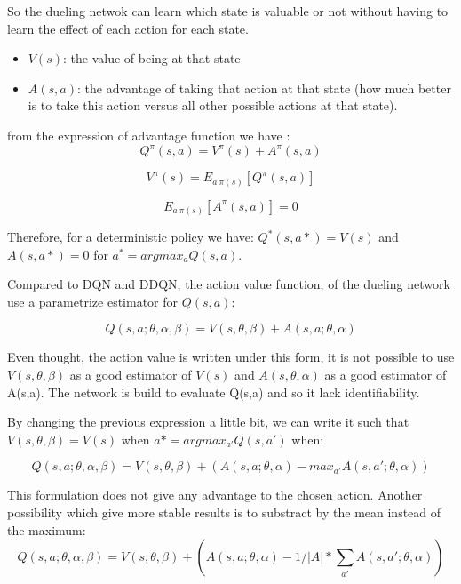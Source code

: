 \documentclass[12pt]{article}
\begin{document}
So the dueling netwok can learn which state is valuable or not without having to learn the effect of each action for each state.
\begin{itemize}
\item $V(s)$: the value of being at that state
\item $A(s,a)$: the advantage of taking that action at that state (how much better is to take this action versus all other possible actions at that state).
\end{itemize}

from the expression of advantage function we have :
\begin{equation}
	Q^{\pi}(s,a)=V^\pi (s) +A^\pi (s,a)
\end{equation}

\begin{equation}
	V^\pi (s)=E_{a ~ \pi(s)}[Q^\pi (s,a)]
\end{equation}

\begin{equation}
	E_{a ~ \pi(s)}[A^\pi (s,a)]=0
\end{equation}

Therefore, for a deterministic policy we have: $Q^*(s,a*)=V(s)$ and $A(s,a*)=0$ for $a^{*}=argmax_a Q(s,a)$.

Compared to DQN and DDQN, the action value function, of the dueling network use a parametrize estimator for $Q(s,a)$:

\begin{equation}
	Q(s,a;\theta,\alpha,\beta)=V(s,\theta,\beta) +A(s,a;\theta,\alpha)
\end{equation}

Even thought, the action value is written under this form, it is not possible to use $V(s,\theta,\beta)$ as a good estimator of $V(s)$ and $A(s,\theta,\alpha)$ as a good estimator of A(s,a). 
The network is build to evaluate Q(s,a) and so it lack identifiability.

By changing the previous expression a little bit, we can write it such that $V(s,\theta,\beta)=V(s)$ when $a*=argmax_{a'}Q(s,a')$ when:

\begin{equation}
	Q(s,a;\theta,\alpha,\beta)=V(s,\theta,\beta) +(A(s,a;\theta,\alpha)-max_{a'}A(s,a';\theta,\alpha))
\end{equation}

This formulation does not give any advantage to the chosen action. 
Another possibility which give more stable results is to substract by the mean instead of the maximum:
\begin{equation}
	Q(s,a;\theta,\alpha,\beta)=V(s,\theta,\beta) +(A(s,a;\theta,\alpha)-1/{|A|}*\sum_{a'} A(s,a';\theta,\alpha))
\end{equation}
\end{document}

